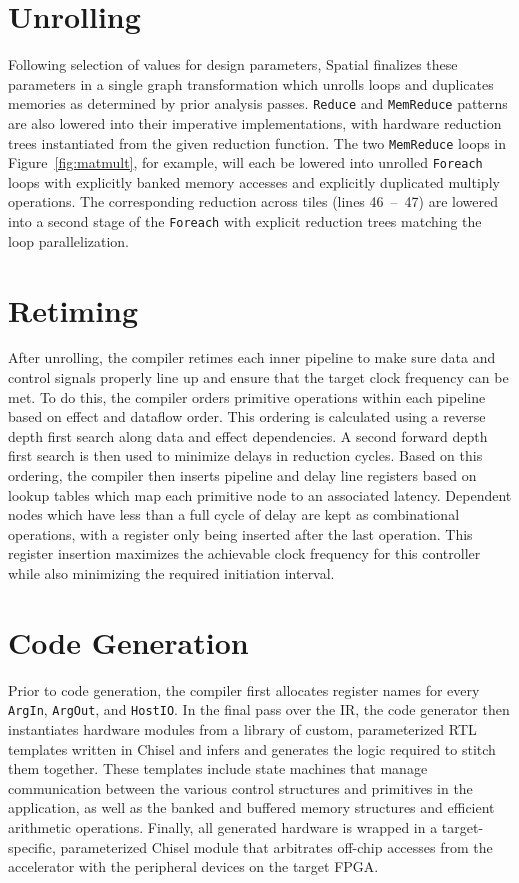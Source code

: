 


\section{Unrolling}
Following selection of values for design parameters, Spatial finalizes these parameters in a single graph transformation which unrolls loops and duplicates memories as determined by prior analysis passes.
\texttt{Reduce} and \texttt{MemReduce} patterns are also lowered into their imperative implementations, with hardware reduction trees instantiated from the given reduction function.
The two \texttt{MemReduce} loops in Figure~\ref{fig:matmult}, for example, will each be lowered into unrolled \texttt{Foreach} loops with explicitly banked memory accesses and explicitly duplicated multiply operations. The corresponding reduction across tiles (lines 46~--~47) are lowered into a second stage of the \texttt{Foreach} with explicit reduction trees matching the loop parallelization.

\section{Retiming}
After unrolling, the compiler retimes each inner pipeline to make sure data and control signals properly line up and ensure that the target clock frequency can be met.
To do this, the compiler orders primitive operations within each pipeline based on effect and dataflow order.
This ordering is calculated using a reverse depth first search along data and effect dependencies.
A second forward depth first search is then used to minimize delays in reduction cycles.
Based on this ordering, the compiler then inserts pipeline and delay line registers based on lookup tables which map each primitive node to an associated latency. Dependent nodes which have less than a full cycle of delay are kept as combinational operations, with a register only being inserted after the last operation.
This register insertion maximizes the achievable clock frequency for this controller while also minimizing the required initiation interval.

\section{Code Generation}
Prior to code generation, the compiler first allocates register names for every \texttt{\small{ArgIn}}, \texttt{\small{ArgOut}}, and \texttt{\small{HostIO}}.
In the final pass over the IR, the code generator then instantiates hardware modules from a library of custom, parameterized RTL templates written in Chisel and infers and generates the logic required to stitch them together.  These templates include state machines that manage communication between the various control structures and primitives in the application, as well as the banked and buffered memory structures and efficient arithmetic operations.  Finally, all generated hardware is wrapped in a target-specific, parameterized Chisel module that arbitrates off-chip accesses from the accelerator with the peripheral devices on the target FPGA.
